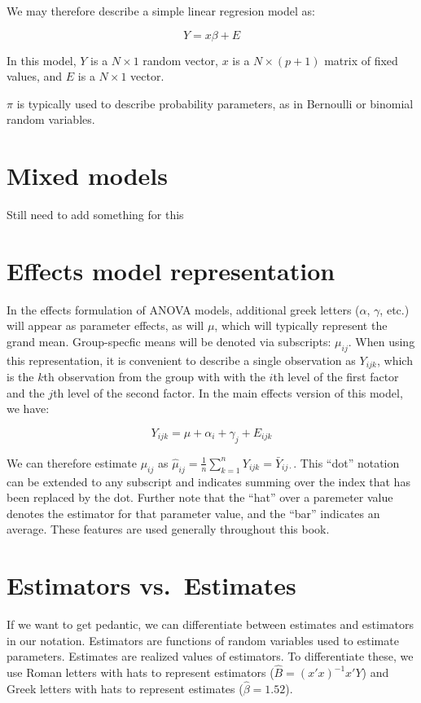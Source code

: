 \documentclass[]{book}
\theoremstyle{definition}
\theoremstyle{definition}
\theoremstyle{definition}
\theoremstyle{remark}
\begin{document}
We may therefore describe a simple linear regresion model as:

\[Y = x\beta + E\]

In this model, \(Y\) is a \(N\times 1\) random vector, \textbf{\(x\)} is
a \(N\times (p + 1)\) matrix of fixed values, and \(E\) is a
\(N \times 1\) vector.

\(\pi\) is typically used to describe probability parameters, as in
Bernoulli or binomial random variables.

\section{Mixed models}\label{mixed-models}

Still need to add something for this

\section{Effects model
representation}\label{effects-model-representation}

In the effects formulation of ANOVA models, additional greek letters
(\(\alpha\), \(\gamma\), etc.) will appear as parameter effects, as will
\(\mu\), which will typically represent the grand mean. Group-specfic
means will be denoted via subscripts: \(\mu_{ij}\). When using this
representation, it is convenient to describe a single observation as
\(Y_{ijk}\), which is the \(k\)th observation from the group with with
the \(i\)th level of the first factor and the \(j\)th level of the
second factor. In the main effects version of this model, we have:

\[Y_{ijk} = \mu + \alpha_i + \gamma_j + E_{ijk}\]

We can therefore estimate \(\mu_{ij}\) as
\(\hat \mu_{ij} = \frac{1}{n}\sum_{k = 1}^n Y_{ijk} = \bar{Y}_{ij\cdot}\).
This ``dot'' notation can be extended to any subscript and indicates
summing over the index that has been replaced by the dot. Further note
that the ``hat'' over a paremeter value denotes the estimator for that
parameter value, and the ``bar'' indicates an average. These features
are used generally throughout this book.

\section{Estimators vs.~Estimates}\label{estimators-vs.estimates}

If we want to get pedantic, we can differentiate between estimates and
estimators in our notation. Estimators are functions of random variables
used to estimate parameters. Estimates are realized values of
estimators. To differentiate these, we use Roman letters with hats to
represent estimators (\(\hat B = (x'x )^{-1}x'Y\)) and Greek letters
with hats to represent estimates (\(\hat \beta = 1.52\)).


\end{document}
